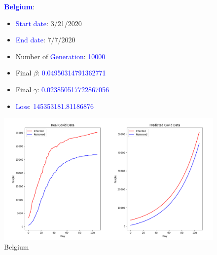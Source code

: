 \documentclass[a4paper]{article}
\begin{document}
    \begin{figure}[ht]
    \centering
    \textbf{\textcolor{blue}{Belgium}}: 
    \begin{itemize}
        \item \textcolor{blue}{Start date}: 3/21/2020
        \item \textcolor{blue}{End date}: 7/7/2020
        \item Number of \textcolor{blue}{Generation}: \textcolor{blue}{10000}
        \item Final $\beta$: \textcolor{blue}{0.04950314791362771}
        \item Final $\gamma$: \textcolor{blue}{0.023850517722867056}
        \item \textcolor{blue}{Loss}: \textcolor{blue}{145353181.81186876}
    \end{itemize}
    
    
    \includegraphics[width= \linewidth]{ex5-plot/Belgium.png}
    
    \caption{Belgium}
    \end{figure}
    
\end{document}
